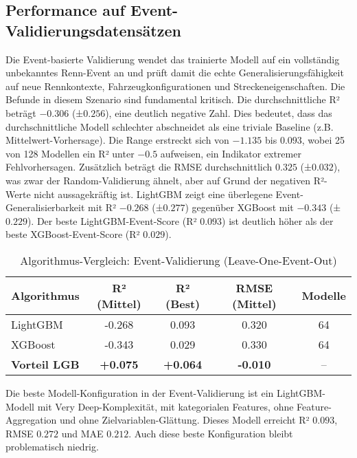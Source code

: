 

\subsection{Performance auf Event-Validierungsdatensätzen}

Die Event-basierte Validierung wendet das trainierte Modell auf ein vollständig unbekanntes Renn-Event an und prüft damit die echte Generalisierungsfähigkeit auf neue Rennkontexte, Fahrzeugkonfigurationen und Streckeneigenschaften. Die Befunde in diesem Szenario sind fundamental kritisch. Die durchschnittliche R² beträgt $-0.306$ (±$0.256$), eine deutlich negative Zahl. Dies bedeutet, dass das durchschnittliche Modell schlechter abschneidet als eine triviale Baseline (z.B. Mittelwert-Vorhersage). Die Range erstreckt sich von $-1.135$ bis $0.093$, wobei 25 von 128 Modellen ein R² unter $-0.5$ aufweisen, ein Indikator extremer Fehlvorhersagen. Zusätzlich beträgt die RMSE durchschnittlich $0.325$ (±$0.032$), was zwar der Random-Validierung ähnelt, aber auf Grund der negativen R²-Werte nicht aussagekräftig ist. LightGBM zeigt eine überlegene Event-Generalisierbarkeit mit R² $-0.268$ (±$0.277$) gegenüber XGBoost mit $-0.343$ (±$0.229$). Der beste LightGBM-Event-Score (R² $0.093$) ist deutlich höher als der beste XGBoost-Event-Score (R² $0.029$).

\begin{table}[H]
  \centering
  \begin{tabular}{lcccc}
    \toprule
    \textbf{Algorithmus} & \textbf{R² (Mittel)} & \textbf{R² (Best)} & \textbf{RMSE (Mittel)} & \textbf{Modelle} \\
    \midrule
    LightGBM & -0.268 & 0.093 & 0.320 & 64 \\
    XGBoost & -0.343 & 0.029 & 0.330 & 64 \\
    \midrule
    \textbf{Vorteil LGB} & \textbf{+0.075} & \textbf{+0.064} & \textbf{-0.010} & -- \\
    \bottomrule
  \end{tabular}
  \caption{Algorithmus-Vergleich: Event-Validierung (Leave-One-Event-Out)}
  \label{tab:algo_event}
\end{table}

Die beste Modell-Konfiguration in der Event-Validierung ist ein LightGBM-Modell mit Very Deep-Komplexität, mit kategorialen Features, ohne Feature-Aggregation und ohne Zielvariablen-Glättung. Dieses Modell erreicht R² $0.093$, RMSE $0.272$ und MAE $0.212$. Auch diese beste Konfiguration bleibt problematisch niedrig.

